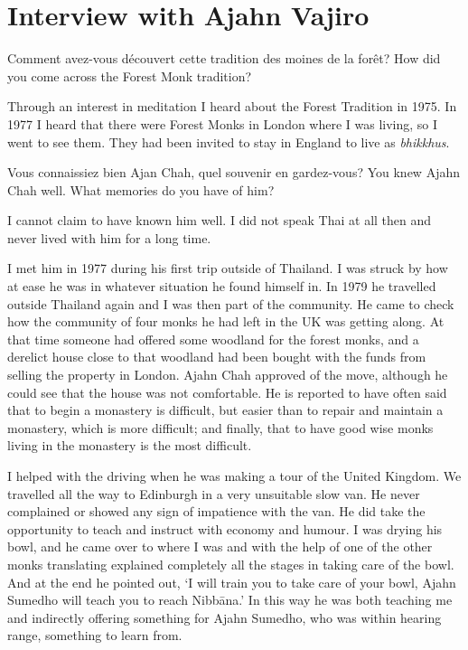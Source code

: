 
\chapter{Interview with Ajahn Vajiro}

\questionBi%
{Comment avez-vous découvert cette tradition des moines de la forêt?}%
{How did you come across the Forest Monk tradition?}

\answer{}
Through an interest in meditation I heard about the Forest Tradition
in 1975. In 1977 I heard that there were Forest Monks in London where I
was living, so I went to see them. They had been invited to stay in
England to live as \emph{bhikkhus}.

\questionBi%
{Vous connaissiez bien Ajan Chah, quel souvenir en gardez-vous?}%
{You knew Ajahn Chah well. What memories do you have of him?}

\answer{}
I cannot claim to have known him well. I did not speak Thai at
all then and never lived with him for a long time.

I met him in 1977 during his first trip outside of Thailand. I was
struck by how at ease he was in whatever situation he found himself in. 
In 1979 he travelled outside Thailand again and I was then part of the
community. He came to check how the community of four monks he had left
in the UK was getting along. At that time someone had offered some
woodland for the forest monks, and a derelict house close to that
woodland had been bought with the funds from selling the property in
London. Ajahn Chah approved of the move, although he could see that the
house was not comfortable. He is reported to have often said that to
begin a monastery is difficult, but easier than to repair and maintain a
monastery, which is more difficult; and finally, that to have good wise
monks living in the monastery is the most difficult. 

I helped with the driving when he was making a tour of the United
Kingdom. We travelled all the way to Edinburgh in a very unsuitable slow
van. He never complained or showed any sign of impatience with the van. 
He did take the opportunity to teach and instruct with economy and
humour. I was drying his bowl, and he came over to where I was and with
the help of one of the other monks translating explained completely all
the stages in taking care of the bowl. And at the end he pointed out, `I
will train you to take care of your bowl, Ajahn Sumedho will teach you
to reach Nibbāna.' In this way he was both teaching me and indirectly
offering something for Ajahn Sumedho, who was within hearing range, 
something to learn from. 

